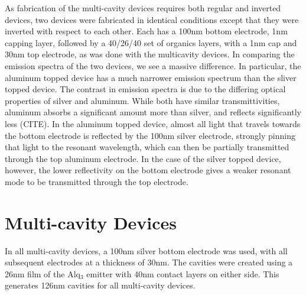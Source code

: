 \documentclass{report}
\begin{document}
            As fabrication of the multi-cavity devices requires both regular and inverted devices, two devices were fabricated in identical conditions except that they were inverted with respect to each other. Each has a 100nm bottom electrode, 1nm capping layer, followed by a 40/26/40 set of organics layers, with a 1nm cap and 30nm top electrode, as was done with the multicavity devices. In comparing the emission spectra of the two devices, we see a massive difference. In particular, the aluminum topped device has a much narrower emission spectrum than the sliver topped device. The contrast in emission spectra is due to the differing optical properties of silver and aluminum. While both have similar transmittivities, aluminum absorbs a significant amount more than silver, and reflects significantly less (CITE). In the aluminum topped device, almost all light that travels towards the bottom electrode is reflected by the 100nm silver electrode, strongly pinning that light to the resonant wavelength, which can then be partially transmitted through the top aluminum electrode. In the case of the silver topped device, however, the lower reflectivity on the bottom electrode gives a weaker resonant mode to be transmitted through the top electrode.

    \section{Multi-cavity Devices}
        In all multi-cavity devices, a 100nm silver bottom electrode was used, with all subsequent electrodes at a thickness of 30nm. The cavities were created using a 26nm film of the Alq$_3$ emitter with 40nm contact layers on either side. This generates 126nm cavities for all multi-cavity devices.
    
\end{document}
